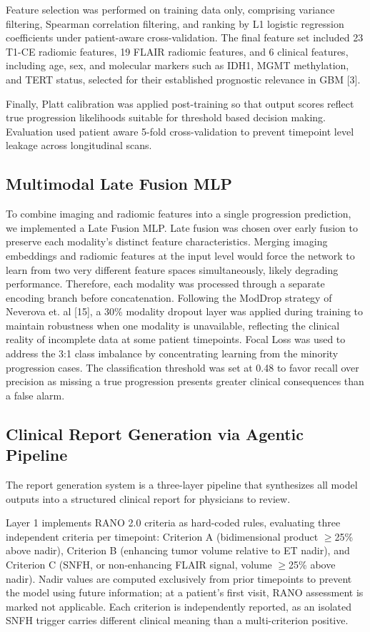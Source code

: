 \documentclass[letterpaper, 10pt, conference]{IEEEtran}
\begin{document}
Feature selection was performed on training data only, comprising variance filtering, Spearman correlation
filtering, and ranking by L1 logistic regression coefficients under patient-aware cross-validation. The final feature
set included 23 T1-CE radiomic features, 19 FLAIR radiomic features, and 6 clinical features, including age, sex, and
molecular markers such as IDH1, MGMT methylation, and TERT status, selected for their established prognostic
relevance in GBM [3].

Finally, Platt calibration was applied post-training so that output scores reflect true progression likelihoods
suitable for threshold based decision making. Evaluation used patient aware 5-fold cross-validation to prevent
timepoint level leakage across longitudinal scans.

\subsection{Multimodal Late Fusion MLP}
To combine imaging and radiomic features into a single progression prediction, we implemented a Late Fusion MLP. Late
fusion was chosen over early fusion to preserve each modality's distinct feature characteristics. Merging imaging
embeddings and radiomic features at the input level would force the network to learn from two very different feature
spaces simultaneously, likely degrading performance. Therefore, each modality was processed through a separate
encoding branch before concatenation. Following the ModDrop strategy of Neverova et. al [15], a 30\% modality dropout
layer was applied during training to maintain robustness when one modality is unavailable, reflecting the clinical
reality of incomplete data at some patient timepoints. Focal Loss was used to address the 3:1 class imbalance by
concentrating learning from the minority progression cases. The classification threshold was set at 0.48 to favor
recall over precision as missing a true progression presents greater clinical consequences than a false alarm.

\subsection{Clinical Report Generation via Agentic Pipeline}
The report generation system is a three-layer pipeline that synthesizes all model outputs into a structured clinical
report for physicians to review.

Layer 1 implements RANO 2.0 criteria as hard-coded rules, evaluating three independent criteria per timepoint:
Criterion A (bidimensional product $\geq$25\% above nadir), Criterion B (enhancing tumor volume relative to ET nadir),
and Criterion C (SNFH, or non-enhancing FLAIR signal, volume $\geq$25\% above nadir). Nadir values are computed
exclusively from prior timepoints to prevent the model using future information; at a patient's first visit, RANO
assessment is marked not applicable. Each criterion is independently reported, as an isolated SNFH trigger carries
different clinical meaning than a multi-criterion positive.
\end{document}
